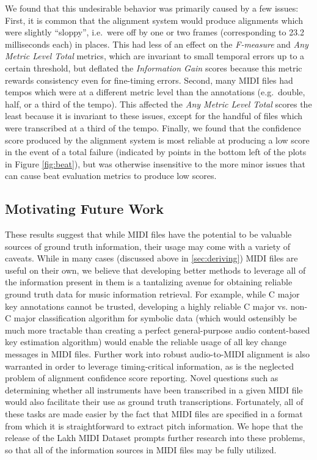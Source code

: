 We found that this undesirable behavior was primarily caused by a few issues:
First, it is common that the alignment system would produce alignments which were slightly ``sloppy'', i.e.\ were off by one or two frames (corresponding to 23.2 milliseconds each) in places.
This had less of an effect on the {\em F-measure} and {\em Any Metric Level Total} metrics, which are invariant to small temporal errors up to a certain threshold, but deflated the {\em Information Gain} scores because this metric rewards consistency even for fine-timing errors.
Second, many MIDI files had tempos which were at a different metric level than the annotations (e.g.\ double, half, or a third of the tempo).
This affected the {\em Any Metric Level Total} scores the least because it is invariant to these issues, except for the handful of files which were transcribed at a third of the tempo.
Finally, we found that the confidence score produced by the alignment system is most reliable at producing a low score in the event of a total failure (indicated by points in the bottom left of the plots in Figure \ref{fig:beat}), but was otherwise insensitive to the more minor issues that can cause beat evaluation metrics to produce low scores.

\subsection{Motivating Future Work}

These results suggest that while MIDI files have the potential to be valuable sources of ground truth information, their usage may come with a variety of caveats.
While in many cases (discussed above in \cref{sec:deriving}) MIDI files are useful on their own, we believe that developing better methods to leverage all of the information present in them is a tantalizing avenue for obtaining reliable ground truth data for music information retrieval.
For example, while C major key annotations cannot be trusted, developing a highly reliable C major vs. non-C major classification algorithm for symbolic data (which would ostensibly be much more tractable than creating a perfect general-purpose audio content-based key estimation algorithm) would enable the reliable usage of all key change messages in MIDI files.
Further work into robust audio-to-MIDI alignment is also warranted in order to leverage timing-critical information, as is the neglected problem of alignment confidence score reporting.
Novel questions such as determining whether all instruments have been transcribed in a given MIDI file would also facilitate their use as ground truth transcriptions.
Fortunately, all of these tasks are made easier by the fact that MIDI files are specified in a format from which it is straightforward to extract pitch information.
We hope that the release of the Lakh MIDI Dataset prompts further research into these problems, so that all of the information sources in MIDI files may be fully utilized.

